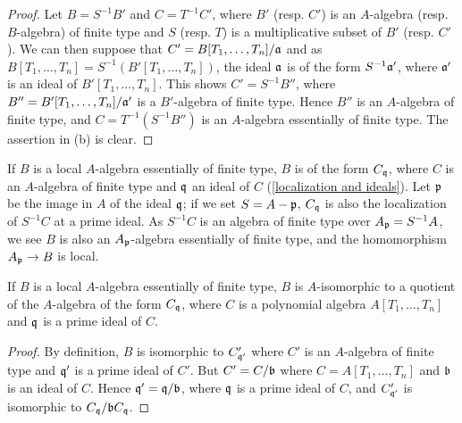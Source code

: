 \begin{proof}
Let $B=S^{-1}B'$ and $C=T^{-1}C'$, where $B'$ (resp. $C'$) is an $A$-algebra (resp. $B$-algebra) of finite type and $S$ (resp. $T$) is a multiplicative subset of $B'$ (resp. $C'$). We can then suppose that $C'=B[T_1,\dots,T_n]/\mathfrak{a}$ and as $B[T_1,\dots,T_n]=S^{-1}(B'[T_1,\dots,T_n])$, the ideal $\mathfrak{a}$ is of the form $S^{-1}\mathfrak{a}'$, where $\mathfrak{a}'$ is an ideal of $B'[T_1,\dots,T_n]$. This shows $C'=S^{-1}B''$, where $B''=B'[T_1,\dots,T_n]/\mathfrak{a}'$ is a $B'$-algebra of finite type. Hence $B''$ is an $A$-algebra of finite type, and $C=T^{-1}(S^{-1}B'')$ is an $A$-algebra essentially of finite type. The assertion in (b) is clear.
\end{proof}
If $B$ is a local $A$-algebra essentially of finite type, $B$ is of the form $C_{\mathfrak{q}}$, where $C$ is an $A$-algebra of finite type and $\mathfrak{q}$ an ideal of $C$ (\cref{localization and ideals}). Let $\mathfrak{p}$ be the image in $A$ of the ideal $\mathfrak{q}$; if we set $S=A-\mathfrak{p}$, $C_{\mathfrak{q}}$ is also the localization of $S^{-1}C$ at a prime ideal. As $S^{-1}C$ is an algebra of finite type over $A_{\mathfrak{p}}=S^{-1}A$, we see $B$ is also an $A_{\mathfrak{p}}$-algebra essentially of finite type, and the homomorphism $A_{\mathfrak{p}}\to B$ is local.
\begin{proposition}\label{algebra local ess ft prop}
If $B$ is a local $A$-algebra essentially of finite type, $B$ is $A$-isomorphic to a quotient of the $A$-algebra of the form $C_{\mathfrak{q}}$, where $C$ is a polynomial algebra $A[T_1,\dots,T_n]$ and $\mathfrak{q}$ is a prime ideal of $C$.
\end{proposition}
\begin{proof}
By definition, $B$ is isomorphic to $C'_{\mathfrak{q}'}$ where $C'$ is an $A$-algebra of finite type and $\mathfrak{q}'$ is a prime ideal of $C'$. But $C'=C/\mathfrak{b}$ where $C=A[T_1,\dots,T_n]$ and $\mathfrak{b}$ is an ideal of $C$. Hence $\mathfrak{q}'=\mathfrak{q}/\mathfrak{b}$, where $\mathfrak{q}$ is a prime ideal of $C$, and $C'_{\mathfrak{q}'}$ is isomorphic to $C_{\mathfrak{q}}/\mathfrak{b} C_{\mathfrak{q}}$.
\end{proof}
